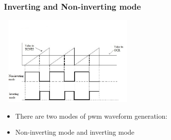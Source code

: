 \documentclass[table,10pt,red]{beamer}	%
\begin{document}
\begin{frame}
	\frametitle{Inverting and Non-inverting mode}
	\centering
	\includegraphics[height = 4.5cm, width = 7cm]{pwm_output}
	\begin{itemize}
		\item <+-|alert@+> There are two modes of pwm waveform generation:
		\item <+-|alert@+> Non-inverting mode and inverting mode 
	\end{itemize}
\end{frame}
\end{document}
